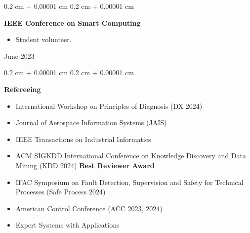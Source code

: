 \documentclass[10pt, letterpaper]{article}
\newenvironment{highlights}{
    \begin{itemize}[
        topsep=0.10 cm,
        parsep=0.10 cm,
        partopsep=0pt,
        itemsep=0pt,
        leftmargin=0.4 cm + 10pt
    ]
}{
    \end{itemize}
} %
\newenvironment{onecolentry}{
    \begin{adjustwidth}{
        0.2 cm + 0.00001 cm
    }{
        0.2 cm + 0.00001 cm
    }
}{
    \end{adjustwidth}
} %
\newenvironment{twocolentry}[2][]{
    \onecolentry
    \def\secondColumn{#2}
    \setcolumnwidth{\fill, 4.5 cm}
    \begin{paracol}{2}
}{
    \switchcolumn \raggedleft \secondColumn
    \end{paracol}
    \endonecolentry
} %
\begin{document}
        \vspace{0.2 cm}

        \begin{twocolentry}{
            June 2023
        }
            \textbf{IEEE Conference on Smart Computing}
            \begin{highlights}
                \item Student volunteer.
            \end{highlights}
        \end{twocolentry}


        \vspace{0.2 cm}

        \begin{onecolentry}
            \textbf{Refereeing}
            \begin{highlights}
                \item International Workshop on Principles of Diagnosis (DX 2024)
                \item Journal of Aerospace Information Systems (JAIS)
                \item IEEE Transactions on Industrial Informatics
                \item ACM SIGKDD International Conference on Knowledge Discovery and Data Mining (KDD 2024) \textbf{Best Reviewer Award}
                \item IFAC Symposium on Fault Detection, Supervision and Safety for Technical Processes (Safe Process 2024)
                \item American Control Conference (ACC 2023, 2024)
                \item Expert Systems with Applications
            \end{highlights}
        \end{onecolentry}



    
\end{document}

